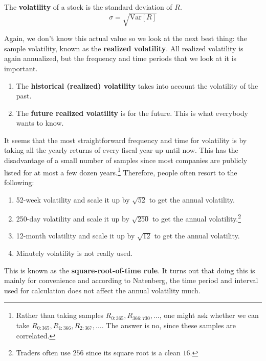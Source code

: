 \documentclass{article}
\begin{document}
    \begin{definition}[Volatility]
      The \textbf{volatility} of a stock is the standard deviation of $R$. 
      \begin{equation}
        \sigma = \sqrt{\mathrm{Var}[R]}
      \end{equation}
    \end{definition}

    \begin{definition}
      Again, we don't know this actual value so we look at the next best thing: the sample volatility, known as the \textbf{realized volatility}. All realized volatility is again annualized, but the frequency and time periods that we look at it is important. 
      \begin{enumerate}
        \item The \textbf{historical (realized) volatility} takes into account the volatility of the past. 
        \item The \textbf{future realized volatility} is for the future. This is what everybody wants to know. 
      \end{enumerate}
    \end{definition}

    It seems that the most straightforward frequency and time for volatility is by taking all the yearly returns of every fiscal year up until now. This has the disadvantage of a small number of samples since most companies are publicly listed for at most a few dozen years.\footnote{Rather than taking samples $R_{0:365}, R_{366:730}, \ldots$, one might ask whether we can take $R_{0:365}, R_{1:366}, R_{2:367}, \ldots$. The answer is no, since these samples are correlated. } Therefore, people often resort to the following: 
    \begin{enumerate}
      \item 52-week volatility and scale it up by $\sqrt{52}$ to get the annual volatility.
      \item 250-day volatility and scale it up by $\sqrt{250}$ to get the annual volatility.\footnote{Traders often use $256$ since its square root is a clean $16$. }
      \item 12-month volatility and scale it up by $\sqrt{12}$ to get the annual volatility.
      \item Minutely volatility is not really used. 
    \end{enumerate}
    This is known as the \textbf{square-root-of-time rule}. It turns out that doing this is mainly for convenience and according to Natenberg, the time period and interval used for calculation does not affect the annual volatility much. 
\end{document}
